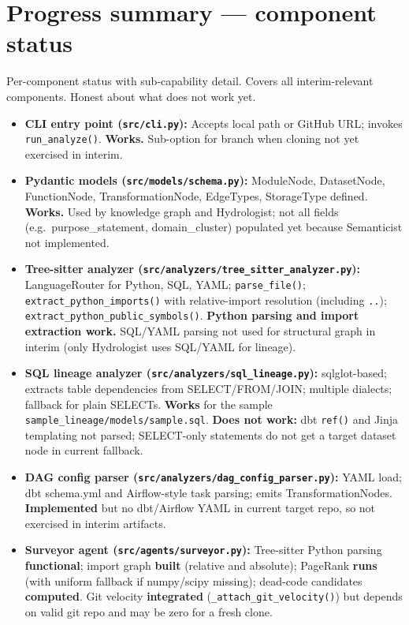 \documentclass[11pt,a4paper]{article}
\begin{document}
\section{Progress summary — component status}

Per-component status with sub-capability detail. Covers all interim-relevant components. Honest about what does not work yet.

\begin{itemize}[leftmargin=*]
  \item \textbf{CLI entry point (\texttt{src/cli.py}):} Accepts local path or GitHub URL; invokes \texttt{run\_analyze()}. \textbf{Works.} Sub-option for branch when cloning not yet exercised in interim.
  \item \textbf{Pydantic models (\texttt{src/models/schema.py}):} ModuleNode, DatasetNode, FunctionNode, TransformationNode, EdgeTypes, StorageType defined. \textbf{Works.} Used by knowledge graph and Hydrologist; not all fields (e.g.\ purpose\_statement, domain\_cluster) populated yet because Semanticist not implemented.
  \item \textbf{Tree-sitter analyzer (\texttt{src/analyzers/tree\_sitter\_analyzer.py}):} LanguageRouter for Python, SQL, YAML; \texttt{parse\_file()}; \texttt{extract\_python\_imports()} with relative-import resolution (including \texttt{..}); \texttt{extract\_python\_public\_symbols()}. \textbf{Python parsing and import extraction work.} SQL/YAML parsing not used for structural graph in interim (only Hydrologist uses SQL/YAML for lineage).
  \item \textbf{SQL lineage analyzer (\texttt{src/analyzers/sql\_lineage.py}):} sqlglot-based; extracts table dependencies from SELECT/FROM/JOIN; multiple dialects; fallback for plain SELECTs. \textbf{Works} for the sample \texttt{sample\_lineage/models/sample.sql}. \textbf{Does not work:} dbt \texttt{ref()} and Jinja templating not parsed; SELECT-only statements do not get a target dataset node in current fallback.
  \item \textbf{DAG config parser (\texttt{src/analyzers/dag\_config\_parser.py}):} YAML load; dbt schema.yml and Airflow-style task parsing; emits TransformationNodes. \textbf{Implemented} but no dbt/Airflow YAML in current target repo, so not exercised in interim artifacts.
  \item \textbf{Surveyor agent (\texttt{src/agents/surveyor.py}):} Tree-sitter Python parsing \textbf{functional}; import graph \textbf{built} (relative and absolute); PageRank \textbf{runs} (with uniform fallback if numpy/scipy missing); dead-code candidates \textbf{computed}. Git velocity \textbf{integrated} (\texttt{\_attach\_git\_velocity()}) but depends on valid git repo and may be zero for a fresh clone.

\end{itemize}
\end{document}
